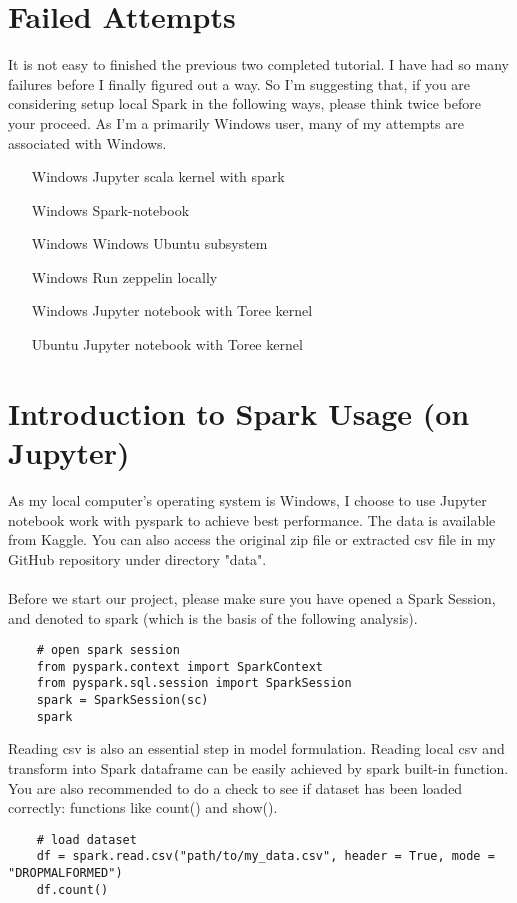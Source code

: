 \documentclass[a4paper, 12pt]{article}
\begin{document}
    \section*{Failed Attempts}
    It is not easy to finished the previous two completed tutorial. I have had so many failures before 
    I finally figured out a way. So I'm suggesting that, if you are considering setup local Spark in 
    the following ways, please think twice before your proceed. As I'm a primarily Windows user, many of 
    my attempts are associated with Windows.
    \begin{itemize}
        \item [Windows] Jupyter scala kernel with spark
        \item [Windows] Spark-notebook
        \item [Windows] Windows Ubuntu subsystem
        \item [Windows] Run zeppelin locally
        \item [Windows] Jupyter notebook with Toree kernel
        \item [Ubuntu] Jupyter notebook with Toree kernel
    \end{itemize}
    
    \section*{Introduction to Spark Usage (on Jupyter)}
    As my local computer's operating system is Windows, I choose to use Jupyter notebook work with pyspark
    to achieve best performance. The data is available from Kaggle\cite{datakaggle}. You can also access 
    the original zip file or extracted csv file in my GitHub repository under directory "data".\\
    \\
    Before we start our project, please make sure you have opened a Spark Session, and denoted to spark 
    (which is the basis of the following analysis).
    \begin{verbatim}
    # open spark session
    from pyspark.context import SparkContext
    from pyspark.sql.session import SparkSession
    spark = SparkSession(sc)
    spark
    \end{verbatim}
    
    Reading csv is also an essential step in model formulation. Reading local csv and transform into 
    Spark dataframe can be easily achieved by spark built-in function. You are also recommended to do 
    a check to see if dataset has been loaded correctly: functions like count() and show().
    \begin{verbatim}
    # load dataset
    df = spark.read.csv("path/to/my_data.csv", header = True, mode = "DROPMALFORMED")
    df.count()
    \end{verbatim}
\end{document}
